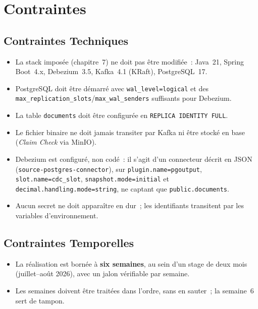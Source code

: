 \documentclass[12pt,a4paper,openany]{report}
\begin{document}
    \chapter{Contraintes}

    \section{Contraintes Techniques}

    \begin{itemize}
      \item La stack impos\'ee (chapitre~7) ne doit pas \^etre modifi\'ee~: Java~21, Spring Boot~4.x, Debezium~3.5, Kafka~4.1 (KRaft), PostgreSQL~17.
      \item PostgreSQL doit \^etre d\'emarr\'e avec \texttt{wal\_level=logical} et des \texttt{max\_replication\_slots}/\texttt{max\_wal\_senders} suffisants pour Debezium.
      \item La table \texttt{documents} doit \^etre configur\'ee en \texttt{REPLICA IDENTITY FULL}.
      \item Le fichier binaire ne doit jamais transiter par Kafka ni \^etre stock\'e en base (\emph{Claim Check} via MinIO).
      \item Debezium est configur\'e, non cod\'e~: il s'agit d'un connecteur d\'ecrit en JSON (\texttt{source-postgres-connector}), sur \texttt{plugin.name=pgoutput}, \texttt{slot.name=cdc\_slot}, \texttt{snapshot.mode=initial} et \texttt{decimal.handling.mode=string}, ne captant que \texttt{public.documents}.
      \item Aucun secret ne doit appara\^itre en dur~; les identifiants transitent par les variables d'environnement.
    \end{itemize}

    \section{Contraintes Temporelles}

    \begin{itemize}
      \item La r\'ealisation est born\'ee \`a \textbf{six semaines}, au sein d'un stage de deux mois (juillet--ao\^ut 2026), avec un jalon v\'erifiable par semaine.
      \item Les semaines doivent \^etre trait\'ees dans l'ordre, sans en sauter~; la semaine~6 sert de tampon.
    \end{itemize}
\end{document}
